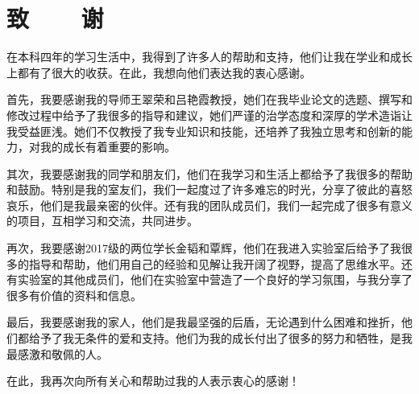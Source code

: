 \section*{致\ \ \ \ 谢}

在本科四年的学习生活中，我得到了许多人的帮助和支持，他们让我在学业和成长上都有了很大的收获。在此，我想向他们表达我的衷心感谢。

首先，我要感谢我的导师王翠荣和吕艳霞教授，她们在我毕业论文的选题、撰写和修改过程中给予了我很多的指导和建议，她们严谨的治学态度和深厚的学术造诣让我受益匪浅。她们不仅教授了我专业知识和技能，还培养了我独立思考和创新的能力，对我的成长有着重要的影响。

其次，我要感谢我的同学和朋友们，他们在我学习和生活上都给予了我很多的帮助和鼓励。特别是我的室友们，我们一起度过了许多难忘的时光，分享了彼此的喜怒哀乐，他们是我最亲密的伙伴。还有我的团队成员们，我们一起完成了很多有意义的项目，互相学习和交流，共同进步。

再次，我要感谢2017级的两位学长金韬和覃辉，他们在我进入实验室后给予了我很多的指导和帮助，他们用自己的经验和见解让我开阔了视野，提高了思维水平。还有实验室的其他成员们，他们在实验室中营造了一个良好的学习氛围，与我分享了很多有价值的资料和信息。

最后，我要感谢我的家人，他们是我最坚强的后盾，无论遇到什么困难和挫折，他们都给予了我无条件的爱和支持。他们为我的成长付出了很多的努力和牺牲，是我最感激和敬佩的人。

在此，我再次向所有关心和帮助过我的人表示衷心的感谢！